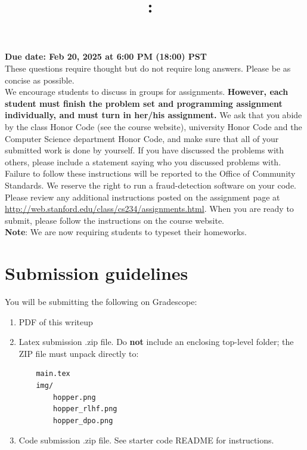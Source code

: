 \documentclass{article}
\title{
\vspace{-1in}
\textmd{\textbf{\hmwkClass:\ \hmwkTitle}}}
\author{}
\date{} %
\begin{document}
\maketitle
\vspace{-.5in}
\begin{framed}
{\bf Due date: Feb 20, 2025 at 6:00 PM (18:00) PST}
\\[1em]
These questions require thought but do not require long answers. Please be as concise as possible.
\\[1em]
We encourage students to discuss in groups for assignments. \textbf{However, each student must finish the
problem set and programming assignment individually, and must turn in her/his assignment.} We ask
that you abide by the class Honor Code (see the course website), university Honor Code and the Computer Science department Honor Code, and make
sure that all of your submitted work is done by yourself. If you have discussed the problems with others,
please include a statement saying who you discussed problems with. Failure to follow these instructions
will be reported to the Office of Community Standards. We reserve the right to run a fraud-detection software on your code.
\\[1em]
Please review any additional instructions posted on the assignment page at
\href{http://web.stanford.edu/class/cs234/assignments.html}{http://web.stanford.edu/class/cs234/assignments.html}. When you are ready to submit, please
follow the instructions on the course website.
\\[1em]
\textbf{Note}: We are now requiring students to typeset their homeworks.
\end{framed}

\section*{Submission guidelines}
You will be submitting the following on Gradescope:
\begin{enumerate}
    \item PDF of this writeup
    \item Latex submission .zip file. Do \textbf{not} include an enclosing top-level folder; the ZIP file must unpack directly to:
    \begin{verbatim}
    main.tex
    img/
        hopper.png
        hopper_rlhf.png
        hopper_dpo.png
    \end{verbatim}
    \item Code submission .zip file. See starter code README for instructions. 
\end{enumerate}
\end{document}

